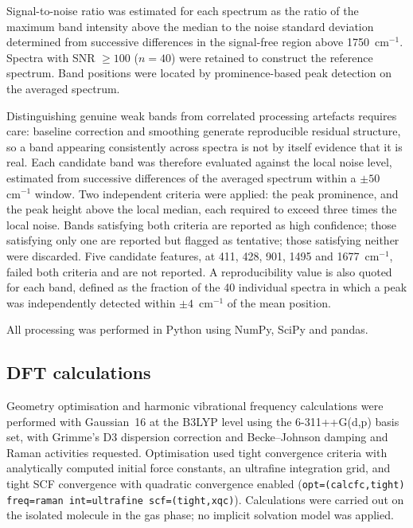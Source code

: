 \documentclass[preprint,12pt]{elsarticle}
\newcommand{\wn}{\ensuremath{\mathrm{cm}^{-1}}}
\begin{document}
Signal-to-noise ratio was estimated for each spectrum as the ratio of the
maximum band intensity above the median to the noise standard deviation
determined from successive differences in the signal-free region above
1750~\wn{}. Spectra with SNR $\geq 100$ ($n = 40$) were retained to construct the reference
spectrum. Band positions were located by prominence-based peak detection on the
averaged spectrum.

Distinguishing genuine weak bands from correlated processing artefacts requires
care: baseline correction and smoothing generate reproducible residual
structure, so a band appearing consistently across spectra is not by itself
evidence that it is real. Each candidate band was therefore evaluated against
the local noise level, estimated from successive differences of the averaged
spectrum within a $\pm 50$~\wn{} window. Two independent criteria were applied:
the peak prominence, and the peak height above the local median, each required
to exceed three times the local noise. Bands satisfying both criteria are
reported as high confidence; those satisfying only one are reported but flagged
as tentative; those satisfying neither were discarded. Five candidate features,
at 411, 428, 901, 1495 and 1677~\wn{}, failed both criteria and are not
reported. A reproducibility value is also quoted for each band, defined as the
fraction of the 40 individual spectra in which a peak was independently detected
within $\pm 4$~\wn{} of the mean position.

All processing was performed in Python using NumPy, SciPy and pandas.

\subsection{DFT calculations}

Geometry optimisation and harmonic vibrational frequency calculations were
performed with Gaussian~16 \cite{gaussian16} at the B3LYP level
\cite{becke1993,lee1988} using the 6-311++G(d,p) basis set, with Grimme's D3
dispersion correction and Becke--Johnson damping \cite{grimme2011} and Raman
activities requested. Optimisation used tight convergence criteria with
analytically computed initial force constants, an ultrafine integration grid,
and tight SCF convergence with quadratic convergence enabled
(\texttt{opt=(calcfc,tight) freq=raman int=ultrafine scf=(tight,xqc)}).
Calculations were carried out on the isolated molecule in the gas phase; no
implicit solvation model was applied.
\end{document}
